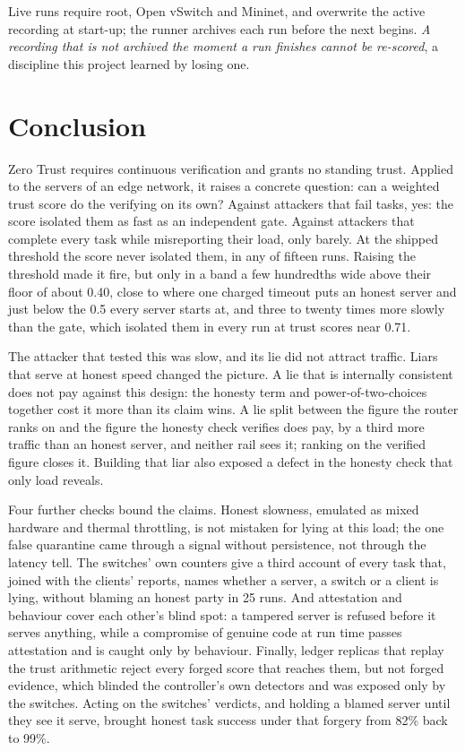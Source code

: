 \documentclass[10pt,twocolumn,letterpaper]{article}
\begin{document}
Live runs require root, Open vSwitch and Mininet, and overwrite the active
recording at start-up; the runner archives each run before the next begins.
\emph{A recording that is not archived the moment a run finishes cannot be
re-scored}, a discipline this project learned by losing one.

\section{Conclusion}
Zero Trust requires continuous verification and grants no standing trust.
Applied to the servers of an edge network, it raises a concrete question: can a
weighted trust score do the verifying on its own? Against attackers that fail
tasks, yes: the score isolated them as fast as an independent gate. Against
attackers that complete every task while misreporting their load, only barely.
At the shipped threshold the score never isolated them, in any of fifteen runs.
Raising the threshold made it fire, but only in a band a few hundredths wide
above their floor of about 0.40, close to where one charged timeout puts an
honest server and just below the 0.5 every server starts at, and three to twenty times more
slowly than the gate, which isolated them in every run at trust scores near
0.71.

The attacker that tested this was slow, and its lie did not attract traffic.
Liars that serve at honest speed changed the picture. A lie that is internally
consistent does not pay against this design: the honesty term and
power-of-two-choices together cost it more than its claim wins. A lie split
between the figure the router ranks on and the figure the honesty check
verifies does pay, by a third more traffic than an honest server, and neither
rail sees it; ranking on the verified figure closes it. Building that liar also
exposed a defect in the honesty check that only load reveals.

Four further checks bound the claims. Honest slowness, emulated as mixed
hardware and thermal throttling, is not mistaken for lying at this load; the
one false quarantine came through a signal without persistence, not through
the latency tell. The switches' own counters give a third account of every
task that, joined with the clients' reports, names whether a server, a switch
or a client is lying, without blaming an honest party in 25 runs. And
attestation and behaviour cover each other's blind spot: a tampered server is
refused before it serves anything, while a compromise of genuine code at run
time passes attestation and is caught only by behaviour. Finally, ledger
replicas that replay the trust arithmetic reject every forged score that
reaches them, but not forged evidence, which blinded the controller's own
detectors and was exposed only by the switches. Acting on the switches'
verdicts, and holding a blamed server until they see it serve, brought honest
task success under that forgery from 82\% back to 99\%.
\end{document}
